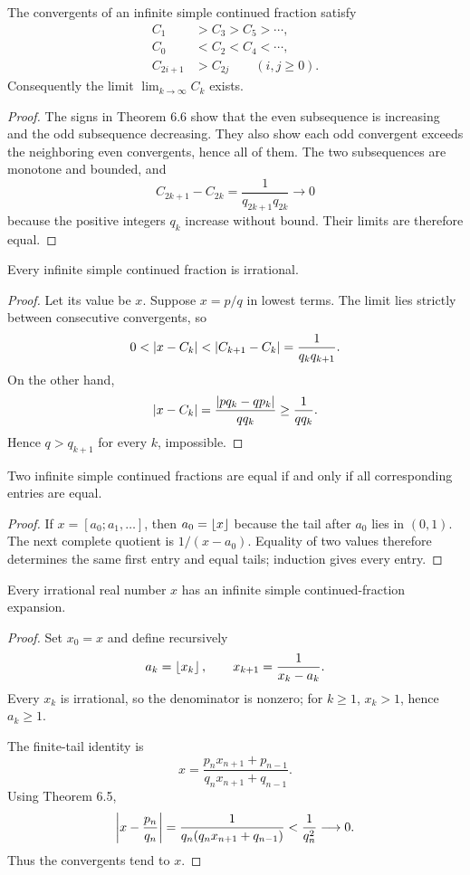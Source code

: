 \begin{thm}
The convergents of an infinite simple continued fraction satisfy
\begin{align*}
 C_1&>C_3>C_5>\cdots,\\
 C_0&<C_2<C_4<\cdots,\\
 C_{2i+1}&>C_{2j}\qquad(i,j\ge0).
\end{align*}
Consequently the limit $\lim_{k\to\infty}C_k$ exists.
\end{thm}
\begin{proof}
The signs in Theorem 6.6 show that the even subsequence is increasing and the odd subsequence decreasing.  They also show each odd convergent exceeds the neighboring even convergents, hence all of them.  The two subsequences are monotone and bounded, and
\[
 C_{2k+1}-C_{2k}=\frac1{q_{2k+1}q_{2k}}\longrightarrow0
\]
because the positive integers $q_k$ increase without bound.  Their limits are therefore equal.
\end{proof}

\begin{thm}
Every infinite simple continued fraction is irrational.
\end{thm}
\begin{proof}
Let its value be $x$.  Suppose $x=p/q$ in lowest terms.  The limit lies strictly between consecutive convergents, so
\[
 0<\abs*{x-C_k}<\abs*{C_{k+1}-C_k}
 =\frac1{q_kq_{k+1}}.
\]
On the other hand,
\[
 \abs*{x-C_k}
 =\frac{\abs*{pq_k-qp_k}}{q q_k}
 \ge\frac1{q q_k}.
\]
Hence $q>q_{k+1}$ for every $k$, impossible.
\end{proof}

\begin{thm}
Two infinite simple continued fractions are equal if and only if all corresponding entries are equal.
\end{thm}
\begin{proof}
If $x=[a_0;a_1,\ldots]$, then $a_0=\floor x$ because the tail after $a_0$ lies in $(0,1)$.  The next complete quotient is
$1/(x-a_0)$.  Equality of two values therefore determines the same first entry and equal tails; induction gives every entry.
\end{proof}

\begin{thm}
Every irrational real number $x$ has an infinite simple continued-fraction expansion.
\end{thm}
\begin{proof}
Set $x_0=x$ and define recursively
\[
 a_k=\floor{x_k},
 \qquad
 x_{k+1}=\frac1{x_k-a_k}.
\]
Every $x_k$ is irrational, so the denominator is nonzero; for $k\ge1$, $x_k>1$, hence $a_k\ge1$.

The finite-tail identity is
\[
 x=\frac{p_nx_{n+1}+p_{n-1}}{q_nx_{n+1}+q_{n-1}}.
\]
Using Theorem 6.5,
\[
 \abs*{x-\frac{p_n}{q_n}}
 =\frac1{q_n(q_nx_{n+1}+q_{n-1})}
 <\frac1{q_n^2}\longrightarrow0.
\]
Thus the convergents tend to $x$.
\end{proof}

